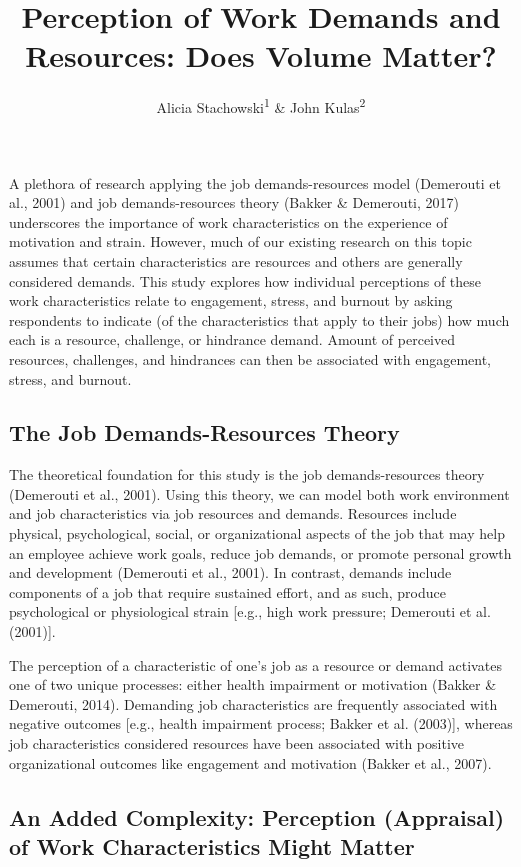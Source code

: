 \documentclass[
  man]{apa6}
\title{Perception of Work Demands and Resources: Does Volume Matter?}
\author{Alicia Stachowski\textsuperscript{1} \& John Kulas\textsuperscript{2}}
\date{}
\affiliation{\vspace{0.5cm}\textsuperscript{1} University of Wisconsin - Stout\\\textsuperscript{2} eRg}
\begin{document}
\maketitle

A plethora of research applying the job demands-resources model (Demerouti et al., 2001) and job demands-resources theory (Bakker \& Demerouti, 2017) underscores the importance of work characteristics on the experience of motivation and strain. However, much of our existing research on this topic assumes that certain characteristics are resources and others are generally considered demands. This study explores how individual perceptions of these work characteristics relate to engagement, stress, and burnout by asking respondents to indicate (of the characteristics that apply to their jobs) how much each is a resource, challenge, or hindrance demand. Amount of perceived resources, challenges, and hindrances can then be associated with engagement, stress, and burnout.

\hypertarget{the-job-demands-resources-theory}{%
\subsection{The Job Demands-Resources Theory}\label{the-job-demands-resources-theory}}

The theoretical foundation for this study is the job demands-resources theory (Demerouti et al., 2001). Using this theory, we can model both work environment and job characteristics via job resources and demands. Resources include physical, psychological, social, or organizational aspects of the job that may help an employee achieve work goals, reduce job demands, or promote personal growth and development (Demerouti et al., 2001). In contrast, demands include components of a job that require sustained effort, and as such, produce psychological or physiological strain {[}e.g., high work pressure; Demerouti et al. (2001){]}.

The perception of a characteristic of one's job as a resource or demand activates one of two unique processes: either health impairment or motivation (Bakker \& Demerouti, 2014). Demanding job characteristics are frequently associated with negative outcomes {[}e.g., health impairment process; Bakker et al. (2003){]}, whereas job characteristics considered resources have been associated with positive organizational outcomes like engagement and motivation (Bakker et al., 2007).

\hypertarget{an-added-complexity-perception-appraisal-of-work-characteristics-might-matter}{%
\subsection{An Added Complexity: Perception (Appraisal) of Work Characteristics Might Matter}\label{an-added-complexity-perception-appraisal-of-work-characteristics-might-matter}}
\end{document}

